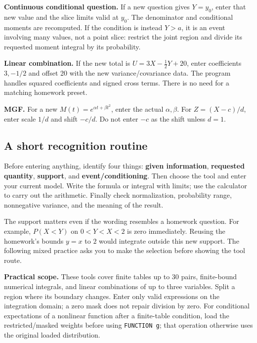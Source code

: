 \textbf{Continuous conditional question.} If a new question gives $Y=y_0$, enter that new value and the slice limits valid at $y_0$. The denominator and conditional moments are recomputed. If the condition is instead $Y>a$, it is an event involving many values, not a point slice: restrict the joint region and divide its requested moment integral by its probability.

\textbf{Linear combination.} If the new total is $U=3X-\frac12Y+20$, enter coefficients $3,-1/2$ and offset 20 with the new variance/covariance data. The program handles squared coefficients and signed cross terms. There is no need for a matching homework preset.

\textbf{MGF.} For a new $M(t)=e^{\alpha t+\beta t^2}$, enter the actual $\alpha,\beta$. For $Z=(X-c)/d$, enter scale $1/d$ and shift $-c/d$. Do not enter $-c$ as the shift unless $d=1$.

\subsection{A short recognition routine}
Before entering anything, identify four things: \textbf{given information}, \textbf{requested quantity}, \textbf{support}, and \textbf{event/conditioning}. Then choose the tool and enter your current model. Write the formula or integral with limits; use the calculator to carry out the arithmetic. Finally check normalization, probability range, nonnegative variance, and the meaning of the result.

The support matters even if the wording resembles a homework question. For example, $P(X<Y)$ on $0<Y<X<2$ is zero immediately. Reusing the homework's bounds $y=x$ to $2$ would integrate outside this new support. The following mixed practice asks you to make the selection before showing the tool route.

\textbf{Practical scope.} These tools cover finite tables up to 30 pairs, finite-bound numerical integrals, and linear combinations of up to three variables. Split a region where its boundary changes. Enter only valid expressions on the integration domain; a zero mask does not repair division by zero. For conditional expectations of a nonlinear function after a finite-table condition, load the restricted/masked weights before using \texttt{FUNCTION g}; that operation otherwise uses the original loaded distribution.

